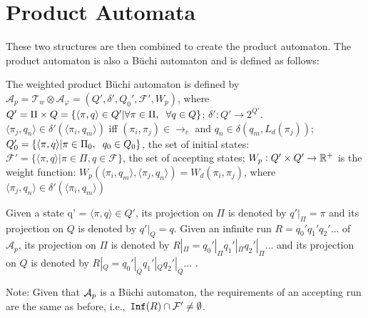 \section{Product Automata}
These two structures are then combined to create the product automaton. The product automaton is also a B\"{u}chi automaton and is defined as follows:
\begin{definition}
The weighted product B\"{u}chi automaton is defined by $\mathcal{A}_p = \mathcal{T}_w \otimes \mathcal{A}_\varphi = (Q', \delta', Q_0', \mathcal{F}', W_p)$, where $Q' = \Pi \times Q = \{ \langle \pi, q \rangle \in Q' | \forall \pi \in \Pi, \hspace{0.2cm} \forall q \in Q \}$; $\delta': Q' \rightarrow 2^{Q'}$. $\langle \pi_j, q_n \rangle \in \delta' (\langle \pi_i, q_m \rangle )$ iff $(\pi_i , \pi_j ) \in \rightarrow_c$ and $q_n \in \delta (q_m, L_d(\pi_j))$; $Q_0' = \{ \langle \pi , q \rangle | \pi \in \Pi_0, \hspace{0.2cm} q_0 \in Q_0\}$, the set of initial states: $\mathcal{F}' = \{ \langle \pi, q \rangle | \pi \in \Pi, q \in \mathcal{F}\}$, the set of accepting states; $W_p: Q' \times Q' \rightarrow \mathbb{R}^+$ is the weight function: $W_p(\langle \pi_i, q_m \rangle , \langle \pi_j, q_n \rangle ) = W_d (\pi_i, \pi_j)$, where $\langle \pi_j, q_n \rangle \in \delta' ( \langle \pi_i, q_m \rangle )$
\end{definition} 

Given a state q' = $\langle \pi, q \rangle \in Q'$, its projection on $\Pi$ is denoted by $q'|_\Pi = \pi$ and its projection on $Q$ is denoted by $q'|_Q = q$. Given an infinite run $R = q_0' q_1' q_2' \dots$ of $\mathcal{A}_p$, its projection on $\Pi$ is denoted by $R|_\Pi = q_0'|_\Pi q_1'|_\Pi q_2'|_\Pi \dots$ and its projection on $Q$ is denoted by $R|_Q  = q_0'|_Q q_1'|_Q q_2'|_Q \dots$ \cite{guo15}. 

Note: Given that $\mathcal{A}_p$ is a B\"{u}chi automaton, the requirements of an accepting run are the same as before, i.e.,\ $\texttt{Inf}(R) \cap \mathcal{F}' \neq \emptyset$.

